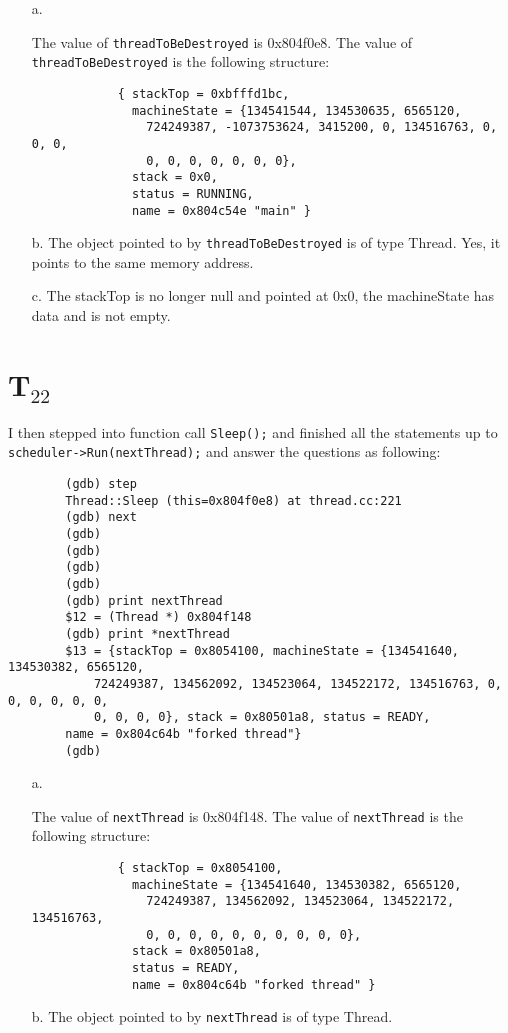 \documentclass[letterpaper, 10pt]{article}
\begin{document}
	\begin{itemize}
		\item[a.]{The value of {\tt threadToBeDestroyed} is 0x804f0e8. The value of {\tt *threadToBeDestroyed} is the following structure:
		\begin{verbatim}
			{ stackTop = 0xbfffd1bc,
			  machineState = {134541544, 134530635, 6565120,
			    724249387, -1073753624, 3415200, 0, 134516763, 0, 0, 0,
			    0, 0, 0, 0, 0, 0, 0},
			  stack = 0x0,
			  status = RUNNING,
			  name = 0x804c54e "main" }
		\end{verbatim}}
		\item[b.]{The object pointed to by {\tt threadToBeDestroyed} is of type Thread. Yes, it points to the same memory address.}
		\item[c.]{The stackTop is no longer null and pointed at 0x0, the machineState has data and is not empty.}
	\end{itemize}

	\section*{T$_{22}$}

	I then stepped into function call {\tt Sleep();} and finished all the statements up to {\tt scheduler->Run(nextThread);} and answer the questions as following:

	\begin{verbatim}
		(gdb) step
		Thread::Sleep (this=0x804f0e8) at thread.cc:221
		(gdb) next
		(gdb)
		(gdb)
		(gdb)
		(gdb)
		(gdb) print nextThread
		$12 = (Thread *) 0x804f148
		(gdb) print *nextThread
		$13 = {stackTop = 0x8054100, machineState = {134541640, 134530382, 6565120,
			724249387, 134562092, 134523064, 134522172, 134516763, 0, 0, 0, 0, 0, 0,
			0, 0, 0, 0}, stack = 0x80501a8, status = READY,
		name = 0x804c64b "forked thread"}
		(gdb)
	\end{verbatim}

	\begin{itemize}
		\item[a.]{The value of {\tt nextThread} is 0x804f148. The value of {\tt *nextThread} is the following structure:
		\begin{verbatim}
			{ stackTop = 0x8054100,
			  machineState = {134541640, 134530382, 6565120,
			    724249387, 134562092, 134523064, 134522172, 134516763,
			    0, 0, 0, 0, 0, 0, 0, 0, 0, 0},
			  stack = 0x80501a8,
			  status = READY,
			  name = 0x804c64b "forked thread" }
		\end{verbatim}}
		\item[b.]{The object pointed to by {\tt nextThread} is of type Thread.}
	\end{itemize}
\end{document}

